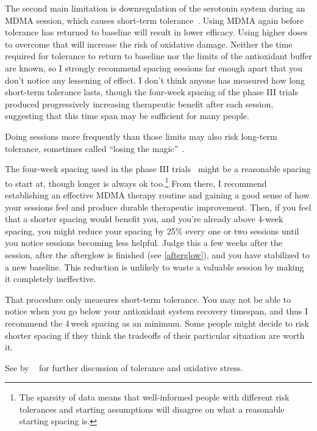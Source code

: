 \documentclass[11pt,oneside]{book}
\let\cite\parencite
\newcommand{\prosecite}[1]{\citetitle{#1} by \citefullauthor{#1}~\cite{#1}}
\begin{document}
The second main limitation is downregulation of the serotonin system during an MDMA session, which causes short-term tolerance~\cite{baggottSerotonin,baggottDamage}. Using MDMA again before tolerance has returned to baseline will result in lower efficacy. Using higher doses to overcome that will increase the risk of oxidative damage. Neither the time required for tolerance to return to baseline nor the limits of the antioxidant buffer are known, so I strongly recommend spacing sessions far enough apart that you don't notice any lessening of effect. I don't think anyone has measured how long short-term tolerance lasts, though the four-week spacing of the phase III trials~\cite{mitchellMDMAClinicalTrial} produced progressively increasing therapeutic benefit after each session, suggesting that this time span may be sufficient for many people.

Doing sessions more frequently than those limits may also risk long-term tolerance, sometimes called \enquote{losing the magic}~\cite{baggottSerotonin,baggottDamage}.

The four-week spacing used in the phase III trials~\cite{mitchellMDMAClinicalTrial} might be a reasonable spacing to start at, though longer is always ok too.\footnote{The sparsity of data means that well-informed people with different risk tolerances and starting assumptions will disagree on what a reasonable starting spacing is.} From there, I recommend establishing an effective MDMA therapy routine and gaining a good sense of how your sessions feel and produce durable therapeutic improvement. Then, if you feel that a shorter spacing would benefit you, and you're already above 4-week spacing, you might reduce your spacing by 25\% every one or two sessions until you notice sessions becoming less helpful. Judge this a few weeks after the session, after the afterglow is finished (see \cref{afterglow}), and you have stabilized to a new baseline. This reduction is unlikely to waste a valuable session by making it completely ineffective.

That procedure only measures short-term tolerance. You may not be able to notice when you go below your antioxidant system recovery timespan, and thus I recommend the 4\,week spacing as an minimum. Some people might decide to risk shorter spacing if they think the tradeoffs of their particular situation are worth it.

See \prosecite{baggottSerotonin} for further discussion of tolerance and oxidative stress.
\end{document}
